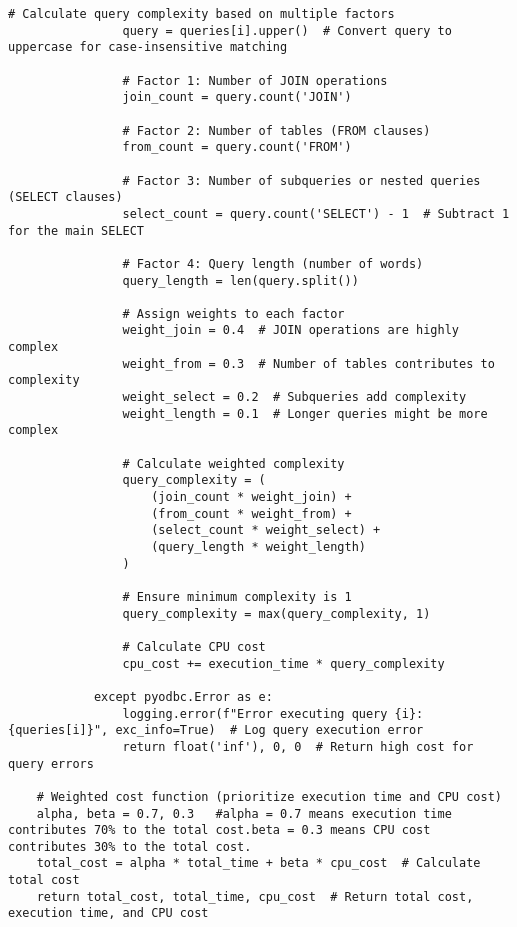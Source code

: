 \begin{lstlisting}[style=pythonstyle, caption={Python script to automate optimal view.}, label={lst:fullCode}]
                # Calculate query complexity based on multiple factors
                query = queries[i].upper()  # Convert query to uppercase for case-insensitive matching

                # Factor 1: Number of JOIN operations
                join_count = query.count('JOIN')

                # Factor 2: Number of tables (FROM clauses)
                from_count = query.count('FROM')

                # Factor 3: Number of subqueries or nested queries (SELECT clauses)
                select_count = query.count('SELECT') - 1  # Subtract 1 for the main SELECT

                # Factor 4: Query length (number of words)
                query_length = len(query.split())

                # Assign weights to each factor
                weight_join = 0.4  # JOIN operations are highly complex
                weight_from = 0.3  # Number of tables contributes to complexity
                weight_select = 0.2  # Subqueries add complexity
                weight_length = 0.1  # Longer queries might be more complex

                # Calculate weighted complexity
                query_complexity = (
                    (join_count * weight_join) +
                    (from_count * weight_from) +
                    (select_count * weight_select) +
                    (query_length * weight_length)
                )

                # Ensure minimum complexity is 1
                query_complexity = max(query_complexity, 1)

                # Calculate CPU cost
                cpu_cost += execution_time * query_complexity

            except pyodbc.Error as e:
                logging.error(f"Error executing query {i}: {queries[i]}", exc_info=True)  # Log query execution error
                return float('inf'), 0, 0  # Return high cost for query errors

    # Weighted cost function (prioritize execution time and CPU cost)
    alpha, beta = 0.7, 0.3   #alpha = 0.7 means execution time contributes 70% to the total cost.beta = 0.3 means CPU cost contributes 30% to the total cost.
    total_cost = alpha * total_time + beta * cpu_cost  # Calculate total cost
    return total_cost, total_time, cpu_cost  # Return total cost, execution time, and CPU cost


\end{lstlisting}
